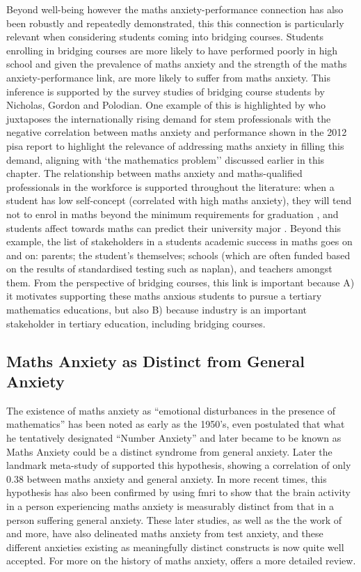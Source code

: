 \documentclass[twoside,12pt,a4paper]{report}
\begin{document}
Beyond well-being however the maths anxiety-performance connection has also been robustly and repeatedly demonstrated, this this connection is particularly relevant when considering students coming into bridging courses. Students enrolling in bridging courses are more likely to have performed poorly in high school and given the prevalence of maths anxiety and the strength of the maths anxiety-performance link, are more likely to suffer from maths anxiety. This inference is supported by the survey studies of bridging course students by Nicholas, Gordon and Polodian. One example of this is highlighted by  who juxtaposes the internationally rising demand for \gls{stem} professionals with the negative correlation between maths anxiety and performance shown in the 2012 \gls{pisa} report \cite{PISA2013} to highlight the relevance of addressing maths anxiety in filling this demand, aligning with `the mathematics problem'' discussed earlier in this chapter. The relationship between maths anxiety and maths-qualified professionals in the workforce is supported throughout the literature: when a student has low self-concept (correlated with high maths anxiety), they will tend not to enrol in maths beyond the minimum requirements for graduation \cite{Ashcraft2007book}, and students affect towards maths can predict their university major \cite{LeFevre1992}. Beyond this example, the list of stakeholders in a students academic success in maths goes on and on: parents; the student's themselves; schools (which are often funded based on the results of standardised testing such as \gls{naplan}), and teachers amongst them. From the perspective of bridging courses, this link is important because A) it motivates supporting these maths anxious students to pursue a tertiary mathematics educations, but also B) because industry is an important stakeholder in tertiary education, including bridging courses. 


\subsection*{Maths Anxiety as Distinct from General Anxiety}

The existence of maths anxiety as ``emotional disturbances in the presence of mathematics'' has been noted as early as the 1950's,  even postulated that what he tentatively designated ``Number Anxiety'' and later became to be known as Maths Anxiety could be a distinct syndrome from general anxiety. Later the landmark meta-study of  supported this hypothesis, showing a correlation of only $0.38$ between maths anxiety and general anxiety. In more recent times, this hypothesis has also been confirmed by  using \gls{fmri} to show that the brain activity in a person experiencing maths anxiety is measurably distinct from that in a person suffering general anxiety. These later studies, as well as the the work of  and more, have also delineated maths anxiety from test anxiety, and these different anxieties existing as meaningfully distinct constructs is now quite well accepted. For more on the history of maths anxiety,  offers a more detailed review.
\end{document}
